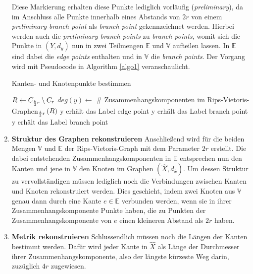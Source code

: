 \documentclass[parskip=half,
 fontsize=12pt, bibtotoc,
 ngerman]
 {article}
\begin{document}
\begin{enumerate}
Diese Markierung erhalten diese Punkte lediglich vorläufig (\textit{preliminary}), da im Anschluss alle Punkte innerhalb eines Abstands von $2r$ von einem \textit{preliminary branch point} als \textit{branch point} gekennzeichnet werden. Hierbei werden auch die \textit{preliminary branch points} zu \textit{branch points}, womit sich die Punkte in $\left(Y, d_y\right)$ nun in zwei Teilmengen $\mathbb{E}$ und $\mathbb{V}$ aufteilen lassen. In $\mathbb{E}$ sind dabei die \textit{edge points} enthalten und in $\mathbb{V}$ die \textit{branch points}. Der Vorgang wird mit Pseudocode in Algorithm \ref{algo1} veranschaulicht. \newline
\begin{algorithm}
\caption{Kanten- und Knotenpunkte bestimmen}\label{algo1}
\begin{algorithmic}
\STATE $R \leftarrow C_{{5\over 3}r} \setminus C_r$ 
\STATE $deg\left(y\right) \leftarrow$ \# Zusammenhangskomponenten im Rips-Vietoris-Graphen$_{{4 \over 3}r}\left(R\right)$
		\STATE y erhält das Label edge point
	\ELSE 
		\STATE y erhält das Label branch point
	\ENDIF
\ENDFOR
{}
		\STATE y erhält das Label branch point
	\ENDIF
\ENDFOR
\end{algorithmic}
\end{algorithm}
\item \textbf{Struktur des Graphen rekonstruieren}\newline
Anschlie{\ss}end wird für die beiden Mengen $\mathbb{V}$ und $\mathbb{E}$ der Rips-Vietoris-Graph mit dem Parameter $2r$ erstellt. Die dabei entstehenden Zusammenhangskomponenten in $\mathbb{E}$ entsprechen nun den Kanten und jene in $\mathbb{V}$ den Knoten im Graphen $(\hat{X}, d_{\hat{x}})$. Um dessen Struktur zu vervollständigen müssen lediglich noch die Verbindungen zwischen Kanten und Knoten rekonstruiert werden. Dies geschieht, indem zwei Knoten aus  $\mathbb{V}$ genau dann durch eine Kante $e \in \mathbb{E}$ verbunden werden, wenn sie in ihrer Zusammenhangskomponente Punkte haben, die zu Punkten der Zusammenhangskomponente von $e$ einen kleineren Abstand als $2r$ haben.

\item \textbf{Metrik rekonstruieren}\newline
Schlussendlich müssen noch die Längen der Kanten bestimmt werden. Dafür wird jeder Kante in $\hat{X}$ als Länge der Durchmesser ihrer Zusammenhangskomponente, also der längste kürzeste Weg darin, zuzüglich $4r$ zugewiesen.
\end{enumerate} 
\end{document}
